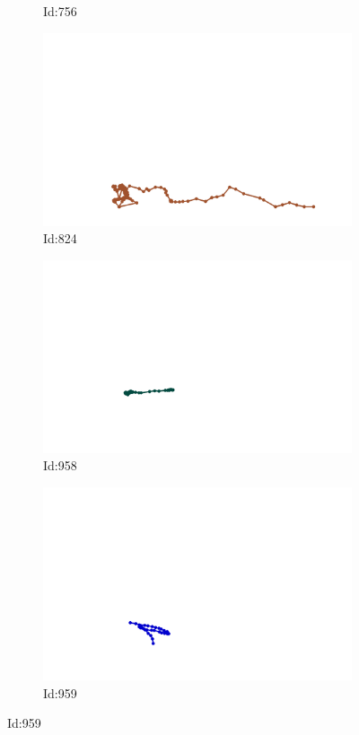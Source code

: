 \documentclass[12pt,twoside]{report}
\begin{document}
\begin{figure}
\begin{subfigure}[b]{0.20\textwidth}
\caption{Id:756}
\end{subfigure}
\begin{subfigure}[b]{0.20\textwidth}
\centering
\includegraphics[width=\textwidth]{../../trajectories/824.png}
\caption{Id:824}
\end{subfigure}
\begin{subfigure}[b]{0.20\textwidth}
\centering
\includegraphics[width=\textwidth]{../../trajectories/958.png}
\caption{Id:958}
\end{subfigure}
\begin{subfigure}[b]{0.20\textwidth}
\centering
\includegraphics[width=\textwidth]{../../trajectories/959.png}
\caption{Id:959}
\end{subfigure}
\end{figure}
\end{document}
